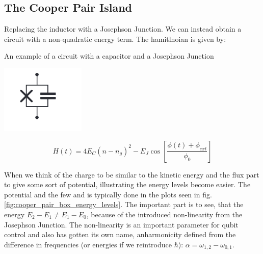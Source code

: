 \subsection{The Cooper Pair Island}
Replacing the inductor with a Josephson Junction. We can instead obtain a circuit with a non-quadratic energy term. The hamitlnoian is given by:
\begin{marginfigure}
    \caption{An example of a circuit with a capacitor and a Josephson Junction}
    \includegraphics[width = \textwidth]{tex/fig_for_text/CooperPairIsland.png}
    \label{fig:cooper_pair_island}
\end{marginfigure}

\begin{equation}
    H(t) =  4 E_C (n - n_g)^2 -  E_J \cos \left[ \frac{\phi(t) + \phi_{ext}}{\phi_0} \right]
\end{equation}

When we think of the charge to be similar to the kinetic energy and the flux part to give some sort of potential, illustrating the energy levels become easier. The potential and the few  and is typically done in the plots seen in fig. \ref{fig:cooper_pair_box_energy_levels}. The important part is to see, that the energy $E_2-E_1 \neq E_1 - E_0$, because of the introduced non-linearity from the Josephson Junction. The non-linearity is an important parameter for qubit control and also has gotten its own name, anharmonicity defined from the difference in frequencies (or energies if we reintroduce $\hbar$): $\alpha = \omega_{1, 2}- \omega_{0, 1}$.  \cite{Bouchiat1}

